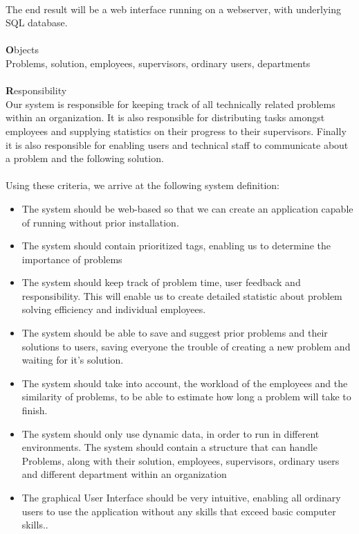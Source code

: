 \\
The end result will be a web interface running on a webserver, with underlying SQL database.\\
\ \\
{\Large \textbf{O}}bjects \\
Problems, solution, employees, supervisors, ordinary users, departments \\
\ \\
{\Large \textbf{R}}esponsibility \\
Our system is responsible for keeping track of all technically related problems within an organization. It is also responsible for distributing tasks amongst employees and supplying statistics on their progress to their supervisors. Finally it is also responsible for enabling users and technical staff to communicate about a problem and the following solution.\\
\ \\
\label{sec:systemdefinition}
Using these criteria, we arrive at the following system definition:
\begin{itemize}
\item The system should be web-based so that we can create an application capable of running without prior installation.
\item The system should contain prioritized tags, enabling us to determine the importance of problems
\item The system should keep track of problem time, user feedback and responsibility. This will enable us to create detailed statistic about problem solving efficiency and individual employees.
\item The system should be able to save and suggest prior problems and their solutions to users, saving everyone the trouble of creating a new problem and waiting for it's solution.
\item The system should take into account, the workload of the employees and the similarity of problems, to be able to estimate how long a problem will take to finish.
\item The system should only use dynamic data, in order to run in different environments.
\subitem The system should contain a structure that can handle Problems, along with their solution, employees, supervisors, ordinary users and different department within an organization
\item The graphical User Interface should be very intuitive, enabling all ordinary users to use the application without any skills that exceed basic computer skills..
\end{itemize}

